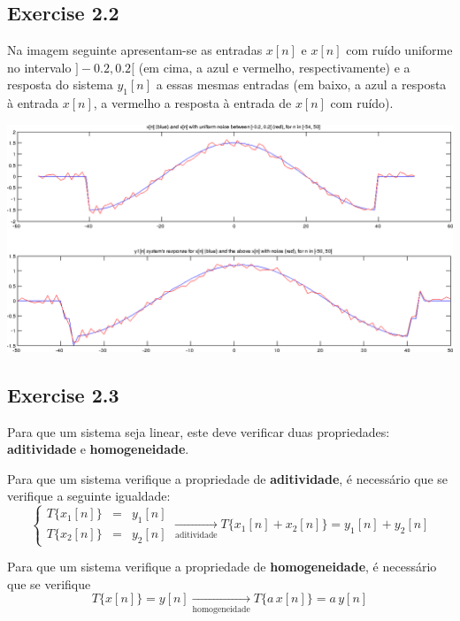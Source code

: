 \documentclass[a4paper]{article}
\begin{document}
\subsection{Exercise 2.2}
\noindent Na imagem seguinte apresentam-se as entradas $x[n]$ e $x[n]$ com ruído uniforme no intervalo $]-0.2, 0.2[$ (em cima, a azul e vermelho, respectivamente) e a resposta do sistema $y_{1}[n]$ a essas mesmas entradas (em baixo, a azul a resposta à entrada $x[n]$, a vermelho a resposta à entrada de $x[n]$ com ruído).

\begin{center}
	\includegraphics[scale=0.45]{images/ex22.png}
	\label{fig:ex22}
\end{center}

\subsection{Exercise 2.3}
\noindent Para que um sistema seja linear, este deve verificar duas propriedades: \textbf{aditividade} e \textbf{homogeneidade}.

\noindent Para que um sistema verifique a propriedade de \textbf{aditividade}, é necessário que se verifique a seguinte igualdade:
\[
	\left\{
		\begin{aligned}
			T\{x_{1}[n]\} & = & y_{1}[n] \\
			T\{x_{2}[n]\} & = & y_{2}[n]
		\end{aligned}
	\right.
	\xrightarrow[\text{aditividade}]{}
	T\{x_{1}[n] + x_{2}[n]\} = y_{1}[n] + y_{2}[n]
\]

\noindent Para que um sistema verifique a propriedade de \textbf{homogeneidade}, é necessário que se verifique
\[
	T\{x[n]\} = y[n] \xrightarrow[\text{homogeneidade}]{} T\{a \, x[n]\} = a \, y[n]
\]
\end{document}
